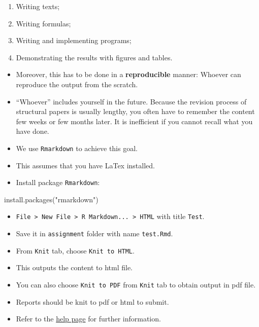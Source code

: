 \documentclass[
]{book}
\newenvironment{Shaded}{\begin{snugshade}}{\end{snugshade}}
\newcommand{\FunctionTok}[1]{\textcolor[rgb]{0.00,0.00,0.00}{#1}}
\newcommand{\NormalTok}[1]{#1}
\newcommand{\StringTok}[1]{\textcolor[rgb]{0.31,0.60,0.02}{#1}}
\providecommand{\tightlist}{%
  \setlength{\itemsep}{0pt}\setlength{\parskip}{0pt}}
\begin{document}
\begin{enumerate}
\def\labelenumi{\arabic{enumi}.}
\tightlist
\item
  Writing texts;
\item
  Writing formulas;
\item
  Writing and implementing programs;
\item
  Demonstrating the results with figures and tables.
\end{enumerate}

\begin{itemize}
\item
  Moreover, this has to be done in a \textbf{reproducible} manner: Whoever can reproduce the output from the scratch.
\item
  ``Whoever'' includes yourself in the future. Because the revision process of structural papers is usually lengthy, you often have to remember the content few weeks or few months later. It is inefficient if you cannot recall what you have done.
\item
  We use \texttt{Rmarkdown} to achieve this goal.
\item
  This assumes that you have LaTex installed.
\item
  Install package \texttt{Rmarkdown}:
\end{itemize}

\begin{Shaded}
\begin{Highlighting}[]
\FunctionTok{install.packages}\NormalTok{(}\StringTok{"rmarkdown"}\NormalTok{)}
\end{Highlighting}
\end{Shaded}

\begin{itemize}
\tightlist
\item
  \texttt{File\ \textgreater{}\ New\ File\ \textgreater{}\ R\ Markdown...\ \textgreater{}\ HTML} with title \texttt{Test}.
\item
  Save it in \texttt{assignment} folder with name \texttt{test.Rmd}.
\item
  From \texttt{Knit} tab, choose \texttt{Knit\ to\ HTML}.
\item
  This outputs the content to html file.
\item
  You can also choose \texttt{Knit\ to\ PDF} from \texttt{Knit} tab to obtain output in pdf file.
\item
  Reports should be knit to pdf or html to submit.
\item
  Refer to the \href{https://rmarkdown.rstudio.com/lesson-1.html}{help page} for further information.
\end{itemize}
\end{document}

